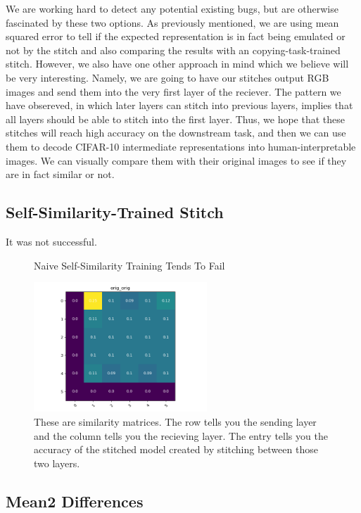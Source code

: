 \documentclass{article} %
\begin{document}
We are working hard to detect any potential existing bugs, but are otherwise fascinated by these two options. As
previously mentioned, we are using mean squared error to tell if the expected representation is in fact being emulated
or not by the stitch and also comparing the results with an copying-task-trained stitch. However, we also have one other
approach in mind which we believe will be very interesting. Namely, we are going to have our stitches output RGB images
and send them into the very first layer of the reciever. The pattern we have obsereved, in which later layers can stitch
into previous layers, implies that all layers should be able to stitch into the first layer. Thus, we hope that these
stitches will reach high accuracy on the downstream task, and then we can use them to decode CIFAR-10 intermediate
representations into human-interpretable images. We can visually compare them with their original images to see if
they are in fact similar or not.

\subsection*{Self-Similarity-Trained Stitch}
It was not successful.

\begin{center}
   \begin{figure}[h!]
      \centering
      \caption{Naive Self-Similarity Training Tends To Fail}
      \includegraphics[width=6.5cm]{resnet1111_1111_autoencoder.png}
      \caption*{These are similarity matrices. The row tells you the sending layer and the column tells you the recieving layer.
      The entry tells you the accuracy of the stitched model created by stitching between those two layers.}
   \end{figure}
\end{center}

\subsection*{Mean2 Differences}
\end{document}
